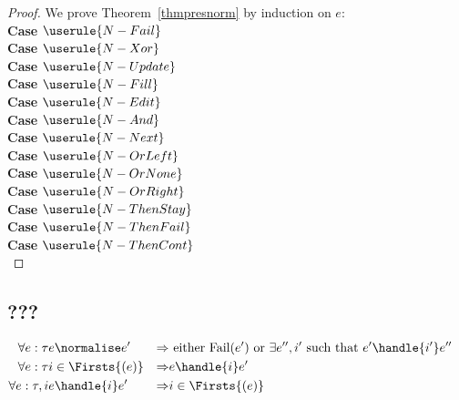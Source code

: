 \begin{proof}
  We prove Theorem~\ref{thmpresnorm} by induction on $e$:\\

  \noindent\textbf{Case} $\userule{N-Fail}$\\

  \noindent\textbf{Case} $\userule{N-Xor}$\\

  \noindent\textbf{Case} $\userule{N-Update}$\\

  \noindent\textbf{Case} $\userule{N-Fill}$\\

  \noindent\textbf{Case} $\userule{N-Edit}$\\

  \noindent\textbf{Case} $\userule{N-And}$\\

  \noindent\textbf{Case} $\userule{N-Next}$\\

  \noindent\textbf{Case} $\userule{N-OrLeft}$\\

  \noindent\textbf{Case} $\userule{N-OrNone}$\\

  \noindent\textbf{Case} $\userule{N-OrRight}$\\

  \noindent\textbf{Case} $\userule{N-ThenStay}$\\

  \noindent\textbf{Case} $\userule{N-ThenFail}$\\

  \noindent\textbf{Case} $\userule{N-ThenCont}$\\

\end{proof}
\subsection{???}

\begin{align*}
  \forall e:\tau & e \normalise e' &\implies& \text{ either Fail}(e') \text{ or } \exists e'',i' \text{ such that } e'\handle{i'}e''&\\
  \forall e:\tau & i\in\Firsts{(e)} &\implies& e\handle{i}e'\\
  \forall e:\tau, i & e\handle{i}e' &\implies& i\in\Firsts{(e)}
\end{align*}

